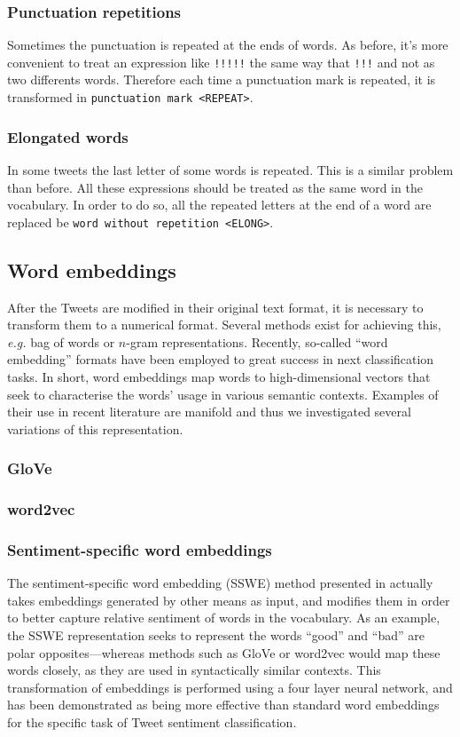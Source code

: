 \subsubsection{Punctuation repetitions}
Sometimes the punctuation is repeated at the ends of words. As before, it's more convenient to treat an expression like \texttt{!!!!!} the same way that \texttt{!!!} and not as two differents words. Therefore each time a punctuation mark is repeated, it is transformed in \texttt{punctuation mark <REPEAT>}. 

\subsubsection{Elongated words}
In some tweets the last letter of some words is repeated. This is a similar problem than before. All these expressions should be treated as the same word in the vocabulary. In order to do so, all the repeated letters at the end of a word are replaced be \texttt{word without repetition <ELONG>}.

\subsection{Word embeddings}
After the Tweets are modified in their original text format, it is necessary to transform them to a numerical format. Several methods exist for achieving this, \emph{e.g.} bag of words or $n$-gram representations. Recently, so-called ``word embedding'' formats \cite{} have been employed to great success in next classification tasks. In short, word embeddings map words to high-dimensional vectors that seek to characterise the words' usage in various semantic contexts. \cite{} Examples of their use in recent literature are manifold \cite{} and thus we investigated several variations of this representation.

\subsubsection{GloVe}

\subsubsection{word2vec}

\subsubsection{Sentiment-specific word embeddings}
The sentiment-specific word embedding (SSWE) method presented in \cite{tang2014learning} actually takes embeddings generated by other means as input, and modifies them in order to better capture relative sentiment of words in the vocabulary. As an example, the SSWE representation seeks to represent the words ``good'' and ``bad'' are polar opposites---whereas methods such as GloVe or word2vec would map these words closely, as they are used in syntactically similar contexts. This transformation of embeddings is performed using a four layer neural network, and has been demonstrated as being more effective than standard word embeddings for the specific task of Tweet sentiment classification.
